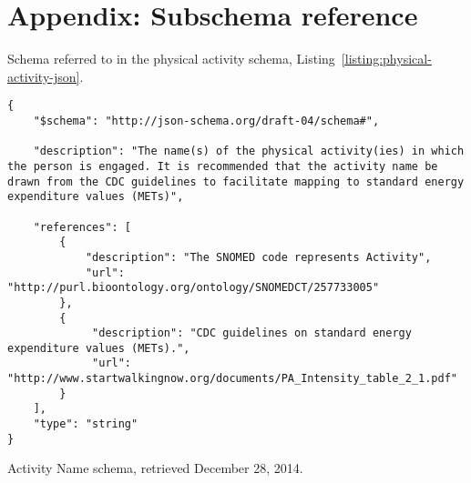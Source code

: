 \section{Appendix: Subschema reference}

Schema referred to in the physical activity schema, Listing~\ref{listing:physical-activity-json}. 
\begin{listing}
\begin{verbatim}
{
    "$schema": "http://json-schema.org/draft-04/schema#",

    "description": "The name(s) of the physical activity(ies) in which the person is engaged. It is recommended that the activity name be drawn from the CDC guidelines to facilitate mapping to standard energy expenditure values (METs)",

    "references": [
        {
            "description": "The SNOMED code represents Activity",
            "url": "http://purl.bioontology.org/ontology/SNOMEDCT/257733005"
        },
        {
             "description": "CDC guidelines on standard energy expenditure values (METs).",
             "url": "http://www.startwalkingnow.org/documents/PA_Intensity_table_2_1.pdf"
        }
    ],
    "type": "string"
}
\end{verbatim}
\caption{Activity Name schema, retrieved December 28, 2014.} 
\label{listing:activity-name-json}
\end{listing}

